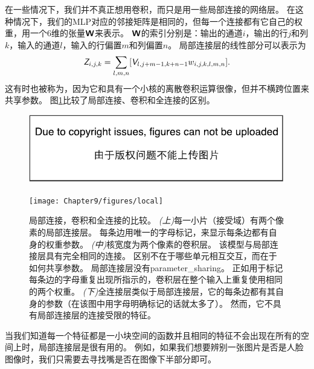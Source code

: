  

在一些情况下，我们并不真正想用卷积，而只是用一些局部连接的网络层\citep{LeCun86,LeCun89a}。
在这种情况下，我们的\gls{MLP}对应的邻接矩阵是相同的，但每一个连接都有它自己的权重，用一个6维的张量$\textsf{\textbf{W}}$来表示。
$\textsf{\textbf{W}}$的索引分别是：输出的通道$i$，输出的行$j$和列$k$，输入的通道$l$，输入的行偏置$m$和列偏置$n$。
局部连接层的线性部分可以表示为
\begin{equation}
\TEZ_{i,j,k} = \sum_{l,m,n} [\TEV_{l, j+m-1, k+n-1} w_{i, j, k, l, m, n}]. %
\end{equation}
这有时也被称为，因为它和具有一个小核的离散卷积运算很像，但并不横跨位置来共享参数。
图\ref{fig:chap9_local}比较了局部连接、卷积和全连接的区别。
\begin{figure}[!htb]
\ifOpenSource
\centerline{\includegraphics{figure.pdf}}
\else
\centerline{\texttt{[image: Chapter9/figures/local]}}
\fi
\caption{局部连接，卷积和全连接的比较。
\emph{(上)}每一小片（接受域）有两个像素的局部连接层。
每条边用唯一的字母标记，来显示每条边都有自身的权重参数。
\emph{(中)}核宽度为两个像素的卷积层。
该模型与局部连接层具有完全相同的连接。
区别不在于哪些单元相互交互，而在于如何共享参数。
局部连接层没有\gls{parameter_sharing}。
正如用于标记每条边的字母重复出现所指示的，卷积层在整个输入上重复使用相同的两个权重。
\emph{(下)}全连接层类似于局部连接层，它的每条边都有其自身的参数（在该图中用字母明确标记的话就太多了）。 然而，它不具有局部连接层的连接受限的特征。}
\label{fig:chap9_local}
\end{figure}
 
 
当我们知道每一个特征都是一小块空间的函数并且相同的特征不会出现在所有的空间上时，局部连接层是很有用的。
例如，如果我们想要辨别一张图片是否是人脸图像时，我们只需要去寻找嘴是否在图像下半部分即可。

